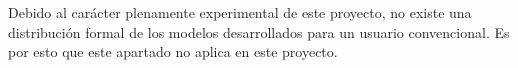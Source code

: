 
Debido al carácter plenamente experimental de este proyecto, no existe una distribución formal de los modelos desarrollados para un usuario convencional. Es por esto que este apartado no aplica en este proyecto.
